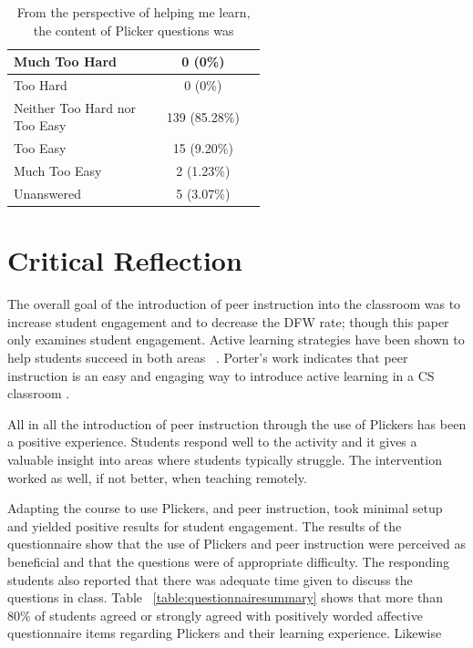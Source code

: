 \documentclass[12pt]{article}
\begin{document}
\begin{table}[ht]
\label{table:questionDifficulty}
\begin{tabular}{p{0.55\linewidth}|c} %
 \rowcolor{LightGray} 
 Much Too Hard & 0 (0\%)\\\midrule 
 Too Hard & 0 (0\%)\\\midrule 
 \rowcolor{LightGray}
 Neither Too Hard nor Too Easy & 139 (85.28\%)\\\midrule 
 Too Easy & 15 (9.20\%)\\\midrule 
 \rowcolor{LightGray}
 Much Too Easy & 2 (1.23\%)\\\midrule 
 Unanswered & 5 (3.07\%)\\\bottomrule 
\end{tabular}
\caption{From the perspective of helping me learn, the content of Plicker questions was}
\end{table}

\section{Critical Reflection}

The overall goal of the introduction of peer instruction into the classroom was to increase student engagement and to decrease the DFW rate; though this paper only examines student engagement.  Active learning strategies have been shown to help students succeed in both areas ~\cite{freemanActiveLearningIncreases2014}.  Porter’s work indicates that peer instruction is an easy and engaging way to introduce active learning in a CS classroom \cite{porterPeerInstructionStudents2011}.

All in all the introduction of peer instruction through the use of Plickers has been a positive experience. Students respond well to the activity and it gives a valuable insight into areas where students typically struggle. The intervention worked as well, if not better, when teaching remotely. 

Adapting the course to use Plickers, and peer instruction, took minimal setup and yielded positive results for student engagement. The results of the questionnaire show that the use of Plickers and peer instruction were perceived as beneficial and that the questions were of appropriate difficulty. The responding students also reported that there was adequate time given to discuss the questions in class. Table ~\ref{table:questionnairesummary} shows that more than 80\% of students agreed or strongly agreed with positively worded affective questionnaire items regarding Plickers and their learning experience. Likewise 
\end{document}
